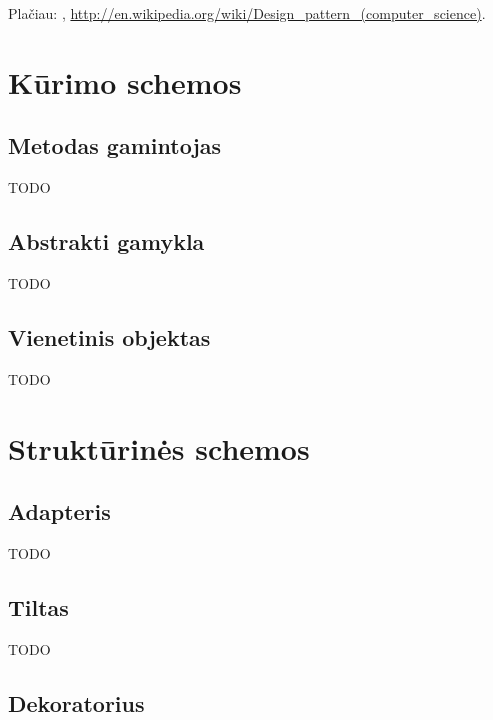 
Plačiau: \cite{gamma1995design}, \cite{martin2003agile}
\url{http://en.wikipedia.org/wiki/Design\_pattern\_(computer\_science)}.

\section{Kūrimo schemos}


\subsection{Metodas gamintojas}


TODO

\subsection{Abstrakti gamykla}


TODO

\subsection{Vienetinis objektas}


TODO

\section{Struktūrinės schemos}


\subsection{Adapteris}


TODO

\subsection{Tiltas}


TODO

\subsection{Dekoratorius}

